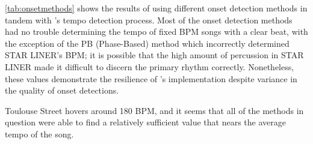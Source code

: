 \documentclass[11pt, oneside]{article}
\begin{document}
\autoref{tab:onsetmethods} shows the results of using different onset detection
methods in tandem with \citeauthor*{bram}'s tempo detection process.
Most of the onset detection methods had no trouble determining the tempo of
fixed BPM songs with a clear beat, with the exception of the PB (Phase-Based)
method which incorrectly determined STAR LINER's BPM; it is possible that the
high amount of percussion in STAR LINER made it difficult to discern the primary
rhythm correctly. Nonetheless, these values demonstrate the resilience of
\citeauthor*{bram}'s implementation despite variance in the quality of onset
detections.

Toulouse Street hovers around 180 BPM, and it seems that all of the methods in
question were able to find a relatively sufficient value that nears the average
tempo of the song.

\newcommand{\fracp}[2]{#1/#2
(\num[round-mode=figures,round-precision=3]{\fpeval{#1/#2*100}}\%)}
\end{document}
